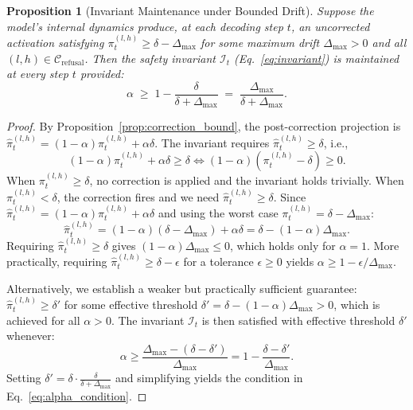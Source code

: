 \documentclass[11pt]{article}
\newtheorem{proposition}{Proposition}
\begin{document}
\begin{proposition}[Invariant Maintenance under Bounded Drift]
\label{prop:invariant}
Suppose the model's internal dynamics produce, at each decoding step $t$, an uncorrected activation satisfying $\pi_t^{(l,h)} \geq \delta - \Delta_{\max}$ for some maximum drift $\Delta_{\max}>0$ and all $(l,h)\in\mathcal{C}_{\mathrm{refusal}}$. Then the safety invariant $\mathcal{I}_t$ (Eq.~\ref{eq:invariant}) is maintained at every step $t$ provided:
\begin{equation}
\label{eq:alpha_condition}
\alpha \;\geq\; 1 - \frac{\delta}{\delta + \Delta_{\max}} \;=\; \frac{\Delta_{\max}}{\delta + \Delta_{\max}}.
\end{equation}
\end{proposition}

\begin{proof}
By Proposition~\ref{prop:correction_bound}, the post-correction projection is $\hat{\pi}_t^{(l,h)} = (1-\alpha)\pi_t^{(l,h)} + \alpha\delta$. The invariant requires $\hat{\pi}_t^{(l,h)}\geq\delta$, i.e.,
\[
(1-\alpha)\pi_t^{(l,h)} + \alpha\delta \geq \delta \iff (1-\alpha)(\pi_t^{(l,h)} - \delta) \geq 0.
\]
When $\pi_t^{(l,h)}\geq\delta$, no correction is applied and the invariant holds trivially. When $\pi_t^{(l,h)}<\delta$, the correction fires and we need $\hat{\pi}_t^{(l,h)}\geq\delta$. Since $\hat{\pi}_t^{(l,h)} = (1-\alpha)\pi_t^{(l,h)}+\alpha\delta$ and using the worst case $\pi_t^{(l,h)} = \delta - \Delta_{\max}$:
\[
\hat{\pi}_t^{(l,h)} = (1-\alpha)(\delta-\Delta_{\max})+\alpha\delta = \delta - (1-\alpha)\Delta_{\max}.
\]
Requiring $\hat{\pi}_t^{(l,h)}\geq\delta$ gives $(1-\alpha)\Delta_{\max}\leq 0$, which holds only for $\alpha=1$. More practically, requiring $\hat{\pi}_t^{(l,h)}\geq\delta-\epsilon$ for a tolerance $\epsilon\geq 0$ yields $\alpha\geq 1-\epsilon/\Delta_{\max}$.

Alternatively, we establish a weaker but practically sufficient guarantee: $\hat{\pi}_t^{(l,h)}\geq\delta'$ for some effective threshold $\delta'=\delta-(1-\alpha)\Delta_{\max}>0$, which is achieved for all $\alpha>0$. The invariant $\mathcal{I}_t$ is then satisfied with effective threshold $\delta'$ whenever:
\begin{equation}
\alpha \geq \frac{\Delta_{\max} - (\delta-\delta')}{\Delta_{\max}} = 1 - \frac{\delta-\delta'}{\Delta_{\max}}.
\end{equation}
Setting $\delta'=\delta\cdot\frac{\delta}{\delta+\Delta_{\max}}$ and simplifying yields the condition in Eq.~\ref{eq:alpha_condition}.
\end{proof}
\end{document}
